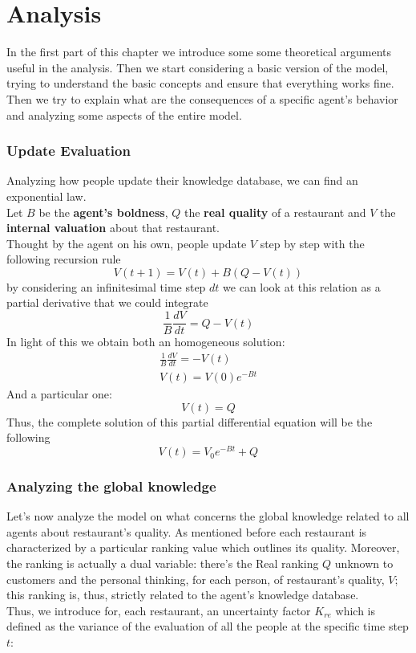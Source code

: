 \documentclass[12pt]{book}
\begin{document}
\chapter{Analysis}
In the first part of this chapter we introduce some some theoretical arguments useful in the analysis. Then we start considering a basic version of the model, trying to understand the basic concepts and ensure that everything works fine. Then we try to explain what are the consequences of a specific agent's behavior and analyzing some aspects of the entire model.   

\subsection{Update Evaluation}
Analyzing how people update their knowledge database, we can find an exponential law.\\
Let $B$ be the \textbf{agent's boldness}, $Q$ the \textbf{real quality} of a restaurant and $V$ the \textbf{internal valuation }about that restaurant. \\   
Thought by the agent on his own, people update $V$ step by step with the following recursion rule
\[V\left( {t + 1} \right) = V\left( t \right) + B\left( {Q - V\left( t \right)} \right)\]
by considering an infinitesimal time step $dt$ we can look at this relation as a partial derivative that we could integrate 
\[\frac{1}{B}\frac{{dV}}{{dt}} = Q - V\left( t \right)\]
In light of this we obtain both an homogeneous solution:
\[\begin{array}{l}
\frac{1}{B}\frac{{dV}}{{dt}} =  - V\left( t \right)\\
V\left( t \right) = V\left( 0 \right){e^{ - Bt}}
\end{array}\]	
And a particular one:
\[V\left( t \right) = Q\]
Thus, the complete solution of this partial differential equation will be the following
\[\boxed{V\left( t \right) = {V_0}{e^{-Bt}} + Q}\]


\subsection{Analyzing the global knowledge}
Let’s now analyze the model on what concerns the global knowledge related to all agents about restaurant’s quality. As mentioned before each restaurant is characterized by a particular ranking value which outlines its quality. Moreover, the ranking is actually a dual variable: there’s the Real ranking $Q$ unknown to customers and the personal thinking, for each person, of restaurant’s quality, $V$; this ranking is, thus, strictly related to the agent’s knowledge database.\\
Thus, we introduce for, each restaurant, an uncertainty factor $K_{re}$ which is defined as the variance of the evaluation of all the people at the specific time step $t$:
\end{document}
